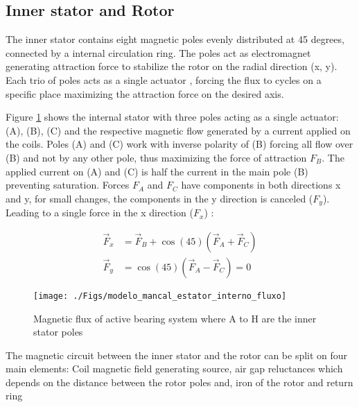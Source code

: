 \documentclass[10pt,fleqn,a4paper,twoside]{article}
\begin{document}
%	
	
	\subsection{Inner stator and Rotor}
	
	The inner stator contains eight magnetic poles evenly distributed at 45 degrees, connected by a internal circulation ring. The poles act as electromagnet generating attraction force to stabilize the rotor on the radial direction (x, y). Each trio of poles acts as a single actuator
	, forcing the flux to cycles on a specific place maximizing the attraction force on the desired axis.
	
	Figure \ref{fig:modelo:mancal:estator:interno:fluxo} shows the internal stator with three poles acting as a single actuator: (A), (B), (C) and the respective magnetic flow generated by a current applied on the coils. Poles (A) and (C) work with inverse polarity of (B) forcing all flow over (B) and not by any other pole, thus maximizing the force of attraction $F_B$. The applied current on (A) and (C) is half the current in the main pole (B) preventing saturation.	Forces $F_A$ and $F_C$  have components in both directions x and y, for small changes, the components in the y direction is canceled ($F_y$). Leading to a single force in the x direction ($F_x$) :
	
	
	\begin{align}
		\vec{F}_x &= \vec{F}_B + \cos(45) (\vec{F}_{A} + \vec{F}_{C}) \label{eq:ativo:F:resultante:y} \\
		\vec{F}_y &=  \cos(45) (\vec{F}_{A} - \vec{F}_{C}) = 0 \label{eq:ativo:F:resultante:x}
	\end{align}	
	

	
	\begin{figure}[ht]
		\centering
		\texttt{[image: ./Figs/modelo\_mancal\_estator\_interno\_fluxo]}
		\caption{Magnetic flux of active bearing system where A to H are the inner stator poles}
		\label{fig:modelo:mancal:estator:interno:fluxo}
	\end{figure}
	
	The magnetic circuit between the inner stator and the rotor can be split on four main elements: Coil magnetic field generating source, air gap reluctances which depends on the distance between the rotor poles and,  iron of the rotor and return ring
	
\end{document}
